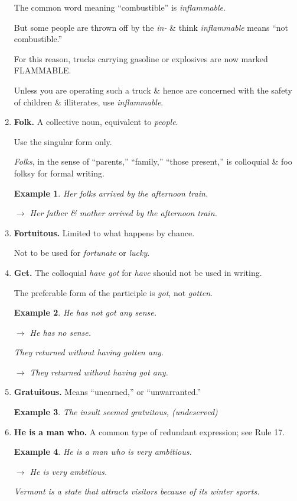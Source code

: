 \documentclass{article}
\newtheorem{example}{Example}
\begin{document}
\begin{enumerate}
	The common word meaning ``combustible'' is {\it inflammable}.
	
	But some people are thrown off by the {\it in-} \& think {\it inflammable} means ``not combustible.''
	
	For this reason, trucks carrying gasoline or explosives are now marked FLAMMABLE.
	
	Unless you are operating such a truck \& hence are concerned with the safety of children \& illiterates, use {\it inflammable}.
	\item {\bf Folk.} A collective noun, equivalent to {\it people}.
	
	Use the singular form only.
	
	{\it Folks}, in the sense of ``parents,'' ``family,'' ``those present,'' is colloquial \& foo folksy for formal writing.
	\begin{example}
		Her folks arrived by the afternoon train.
		
		$\to$ Her father \& mother arrived by the afternoon train.
	\end{example}
	\item {\bf Fortuitous.} Limited to what happens by chance.
	
	Not to be used for {\it fortunate} or {\it lucky}.
	\item {\bf Get.} The colloquial {\it have got} for {\it have} should not be used in writing.
	
	The preferable form of the participle is {\it got}, not {\it gotten}.
	\begin{example}
		He has not got any sense.
		
		$\to$ He has no sense.
		
		They returned without having gotten any.
		
		$\to$ They returned without having got any.
	\end{example}
	\item {\bf Gratuitous.} Means ``unearned,'' or ``unwarranted.''
	\begin{example}
		The insult seemed gratuitous, (undeserved)
	\end{example}
	\item {\bf He is a man who.} A common type of redundant expression; see Rule 17.
	\begin{example}
		He is a man who is very ambitious.
		
		$\to$ He is very ambitious.
		
		Vermont is a state that attracts visitors because of its winter sports.
		

\end{example}
\end{enumerate}
\end{document}
